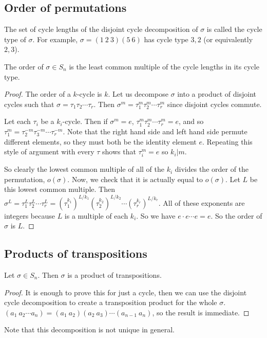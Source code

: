 \subsection{Order of permutations}
The set of cycle lengths of the disjoint cycle decomposition of \(\sigma\) is called the cycle type of \(\sigma\).
For example, \(\sigma = (1\ 2\ 3)(5\ 6)\) has cycle type \(3, 2\) (or equivalently \(2, 3\)).

\begin{theorem}
	The order of \(\sigma \in S_n\) is the least common multiple of the cycle lengths in its cycle type.
\end{theorem}
\begin{proof}
	The order of a \(k\)-cycle is \(k\).
	Let us decompose \(\sigma\) into a product of disjoint cycles such that \(\sigma = \tau_1 \tau_2 \cdots \tau_r\).
	Then \(\sigma^m = \tau_1^m \tau_2^m \cdots \tau_r^m\) since disjoint cycles commute.

	Let each \(\tau_i\) be a \(k_i\)-cycle.
	Then if \(\sigma^m = e\), \(\tau_1^m \tau_2^m \cdots \tau_r^m = e\), and so \(\tau_1^m = \tau_2^{-m} \tau_3^{-m} \cdots \tau_r^{-m}\).
	Note that the right hand side and left hand side permute different elements, so they must both be the identity element \(e\).
	Repeating this style of argument with every \(\tau\) shows that \(\tau_i^m = e\) so \(k_i | m\).

	So clearly the lowest common multiple of all of the \(k_i\) divides the order of the permutation, \(o(\sigma)\).
	Now, we check that it is actually equal to \(o(\sigma)\).
	Let \(L\) be this lowest common multiple.
	Then \(\sigma^L = \tau_1^L \tau_2^L \cdots \tau_r^L = (\tau_1^{k_1})^{L/k_1} (\tau_2^{k_2})^{L/k_2} \cdots (\tau_r^{k_r})^{L/k_r}\).
	All of these exponents are integers because \(L\) is a multiple of each \(k_i\).
	So we have \(e \cdot e \cdots e = e\).
	So the order of \(\sigma\) is \(L\).
\end{proof}

\subsection{Products of transpositions}
\begin{proposition}
	Let \(\sigma \in S_n\).
	Then \(\sigma\) is a product of transpositions.
\end{proposition}
\begin{proof}
	It is enough to prove this for just a cycle, then we can use the disjoint cycle decomposition to create a transposition product for the whole \(\sigma\).
	\((a_1\ a_2\cdots a_n) = (a_1\ a_2)(a_2\ a_3)\cdots(a_{n-1}\ a_n)\), so the result is immediate.
\end{proof}
\noindent Note that this decomposition is not unique in general.

